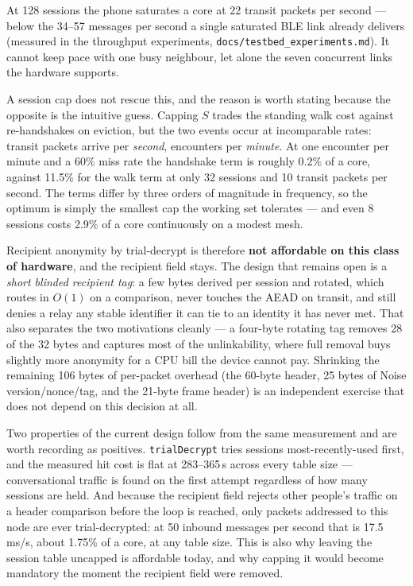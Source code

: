 \documentclass[11pt]{report}
\newcommand{\code}[1]{\texttt{\small #1}}
\begin{document}
At 128 sessions the phone saturates a core at 22 transit packets per second --- below the 34--57 messages per second a single saturated BLE link already delivers (measured in the throughput experiments, \code{docs/testbed_experiments.md}). It cannot keep pace with one busy neighbour, let alone the seven concurrent links the hardware supports.

A session cap does not rescue this, and the reason is worth stating because the opposite is the intuitive guess. Capping $S$ trades the standing walk cost against re-handshakes on eviction, but the two events occur at incomparable rates: transit packets arrive per \emph{second}, encounters per \emph{minute}. At one encounter per minute and a 60\% miss rate the handshake term is roughly 0.2\% of a core, against 11.5\% for the walk term at only 32 sessions and 10 transit packets per second. The terms differ by three orders of magnitude in frequency, so the optimum is simply the smallest cap the working set tolerates --- and even 8 sessions costs 2.9\% of a core continuously on a modest mesh.

Recipient anonymity by trial-decrypt is therefore \textbf{not affordable on this class of hardware}, and the recipient field stays. The design that remains open is a \emph{short blinded recipient tag}: a few bytes derived per session and rotated, which routes in $O(1)$ on a comparison, never touches the AEAD on transit, and still denies a relay any stable identifier it can tie to an identity it has never met. That also separates the two motivations cleanly --- a four-byte rotating tag removes 28 of the 32 bytes and captures most of the unlinkability, where full removal buys slightly more anonymity for a CPU bill the device cannot pay. Shrinking the remaining 106 bytes of per-packet overhead (the 60-byte header, 25 bytes of Noise version/nonce/tag, and the 21-byte frame header) is an independent exercise that does not depend on this decision at all.

Two properties of the current design follow from the same measurement and are worth recording as positives. \code{trialDecrypt} tries sessions most-recently-used first, and the measured hit cost is flat at 283--365\,\textmu s across every table size --- conversational traffic is found on the first attempt regardless of how many sessions are held. And because the recipient field rejects other people's traffic on a header comparison before the loop is reached, only packets addressed to this node are ever trial-decrypted: at 50 inbound messages per second that is 17.5\,ms/s, about 1.75\% of a core, at any table size. This is also why leaving the session table uncapped is affordable today, and why capping it would become mandatory the moment the recipient field were removed.
\end{document}
